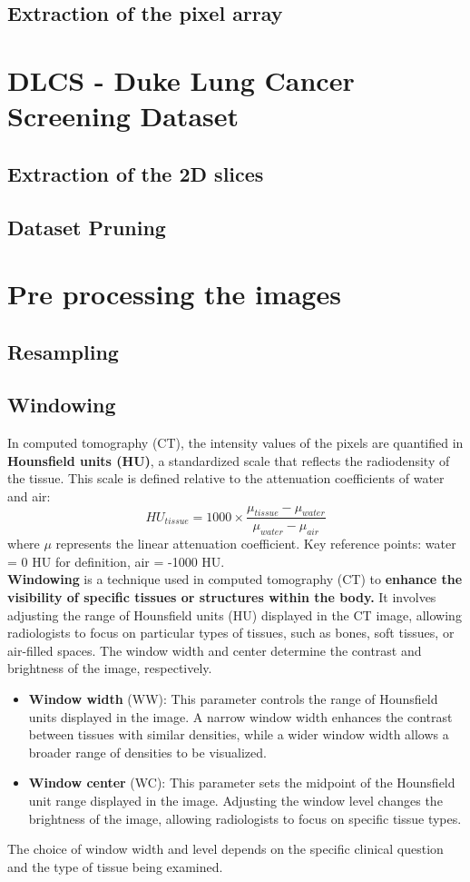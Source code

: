 \subsection{Extraction of the pixel array}
\section{DLCS - Duke Lung Cancer Screening Dataset}
\subsection{Extraction of the 2D slices}
\subsection{Dataset Pruning}

\section{Pre processing the images}
\subsection{Resampling}
\subsection{Windowing}
In computed tomography (CT), the intensity values of the pixels are quantified in \textbf{Hounsfield units (HU)}, a standardized scale that reflects the radiodensity of the tissue. This scale is defined relative to the attenuation coefficients of water and air:
\begin{equation}
    HU_{tissue} = 1000 \times \dfrac{\mu_{tissue} - \mu_{water}}{\mu_{water}-\mu_{air}}
\end{equation}
where $\mu$ represents the linear attenuation coefficient. Key reference points: water = 0 HU for definition, air = -1000 HU. \\
\textbf{Windowing} is a technique used in computed tomography (CT) to \textbf{enhance the visibility of specific tissues or structures within the body.} It involves adjusting the range of Hounsfield units (HU) displayed in the CT image, allowing radiologists to focus on particular types of tissues, such as bones, soft tissues, or air-filled spaces. The window width and center determine the contrast and brightness of the image, respectively.
\begin{itemize}
    \item \textbf{Window width} (WW): This parameter controls the range of Hounsfield units displayed in the image. A narrow window width enhances the contrast between tissues with similar densities, while a wider window width allows a broader range of densities to be visualized.
    \item \textbf{Window center} (WC): This parameter sets the midpoint of the Hounsfield unit range displayed in the image. Adjusting the window level changes the brightness of the image, allowing radiologists to focus on specific tissue types.
\end{itemize}
The choice of window width and level depends on the specific clinical question and the type of tissue being examined. 

